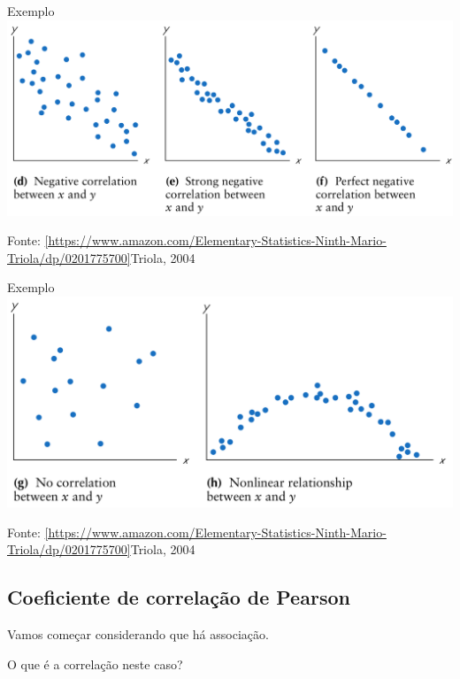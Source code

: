 \documentclass{beamer}
\begin{document}
\begin{frame}{\scriptsize Exemplo}
  \includegraphics[height=0.6\textheight]{Cap17/negative}

  \vfill
  \hfill \tiny Fonte: \ref{https://www.amazon.com/Elementary-Statistics-Ninth-Mario-Triola/dp/0201775700}{Triola, 2004}
\end{frame}

\begin{frame}{\scriptsize Exemplo}
  \includegraphics[height=0.6\textheight]{Cap17/other}

  \vfill
  \hfill \tiny Fonte: \ref{https://www.amazon.com/Elementary-Statistics-Ninth-Mario-Triola/dp/0201775700}{Triola, 2004}
\end{frame}


\subsection[Pearson]{Coeficiente de correlação de Pearson}

\begin{frame}{\scriptsize}
  \begin{center}
    Vamos começar considerando que há associação.

    \bigskip
    O que é a correlação neste caso?
  \end{center}
\end{frame}
\end{document}
